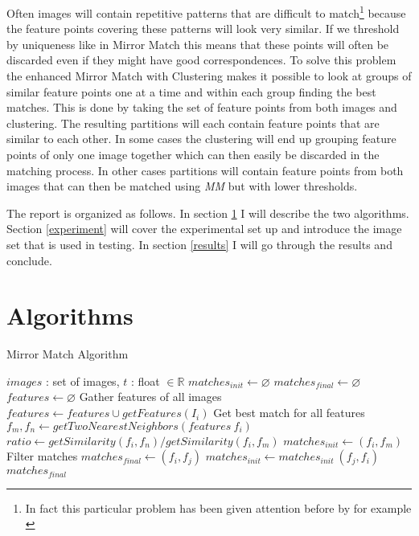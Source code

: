 \documentclass{article}
\begin{document}
Often images will contain repetitive patterns that are difficult to 
match\footnote{In fact this particular problem has been given attention 
before by for example \cite{fan2011towards}} because the feature points 
covering these patterns will look very similar. If we threshold by 
uniqueness like in Mirror Match this means that these points will often 
be discarded even if they might have good correspondences. To solve this 
problem the enhanced Mirror Match with Clustering makes it possible to 
look at groups of similar feature points one at a time and within each 
group finding the best matches. This is done by taking the set of 
feature points from both images and clustering. The resulting partitions 
will each contain feature points that are similar to each other. In some 
cases the clustering will end up grouping feature points of only one 
image together which can then easily be discarded in the matching 
process. In other cases partitions will contain feature points from both 
images that can then be matched using \emph{MM} but with lower 
thresholds.

The report is organized as follows. In section \ref{algorithms} I will 
describe the two algorithms. Section \ref{experiment} will cover the 
experimental set up and introduce the image set that is used in testing.  
In section \ref{results} I will go through the results and conclude.

\section{Algorithms}
\label{algorithms}

\begin{algorithm}
\caption{Mirror Match Algorithm}
\label{alg-mm}
\begin{algorithmic}
\Require $images$ : set of images, $t$ : float $\in \mathbb{R}$
\State $matches_{init}\gets \varnothing$
\State $matches_{final}\gets \varnothing$
\State $features\gets \varnothing$
 \Comment Gather features of all images
	\State $features\gets features \cup getFeatures(I_i)$
\EndFor
{} \Comment Get best match for all features
	\State $f_m,f_n \gets getTwoNearestNeighbors(features \ {f_i})$
	\State $ratio \gets getSimilarity(f_i, f_n) / getSimilarity(f_i, 
f_m)$
		\State $matches_{init}\gets \left(f_i, f_m\right)$
	\EndIf
\EndFor
{} \Comment Filter 
matches
		\State $matches_{final} \gets (f_i, f_j)$
		\State $matches_{init} \gets matches_{init} \ (f_j, f_i)$
	\EndIf
\EndFor \\
\Return $matches_{final}$
\end{algorithmic}
\end{algorithm}
\end{document}
